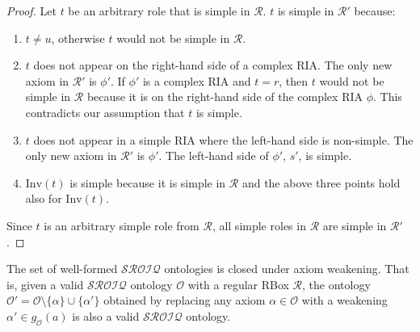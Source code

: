 \begin{proof}
Let $t$ be an arbitrary role that is simple in $\mathcal{R}$.
$t$ is simple in $\mathcal{R}'$ because:
\begin{enumerate}
    \item  $t \not= u$, otherwise $t$ would not be simple in $\mathcal{R}$.
    \item $t$ does not appear on the right-hand side of a complex RIA. The only new axiom in $\mathcal{R}'$ is $\phi'$. If $\phi'$ is a complex RIA and $t = r$, then $t$ would not be simple in $\mathcal{R}$ because it is on the right-hand side of the complex RIA $\phi$. This contradicts our assumption that $t$ is simple.
    \item $t$ does not appear in a simple RIA where the left-hand side is non-simple. The only new axiom in $\mathcal{R}'$ is $\phi'$. The left-hand side of $\phi'$, $s'$, is simple.
    \item $\mathrm{Inv}(t)$ is simple because it is simple in $\mathcal{R}$ and the above three points hold also for $\mathrm{Inv}(t)$.
\end{enumerate}

Since $t$ is an arbitrary simple role from $\mathcal{R}$, all simple roles in $\mathcal{R}$ are simple in $\mathcal{R}'$.
\end{proof}

\begin{theorem} \label{the:closed}
The set of well-formed $\mathcal{SROIQ}$ ontologies is closed under axiom weakening. That is, given a valid $\mathcal{SROIQ}$ ontology $\mathcal{O}$ with a regular RBox $\mathcal{R}$, the ontology $\mathcal{O}' = \mathcal{O} \setminus \{\alpha\} \cup \{\alpha'\}$ obtained by replacing any axiom $\alpha \in \mathcal{O}$ with a weakening $\alpha' \in g_\mathcal{O}(a)$ is also a valid $\mathcal{SROIQ}$ ontology.
\end{theorem}

